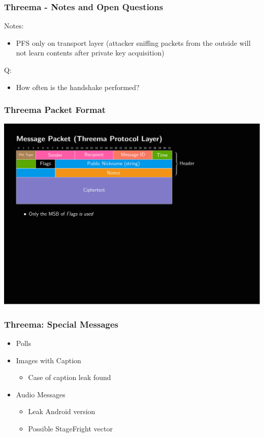 \documentclass[aspectratio=169]{beamer}
\begin{document}
\begin{frame}
	\frametitle{Threema - Notes and Open Questions}
	Notes:
	\begin{itemize}
		\item PFS only on transport layer (attacker sniffing packets from the outside will not learn contents after private key acquisition)
	\end{itemize}
	Q:
	\begin{itemize}
		\item How often is the handshake performed?
	\end{itemize}
\end{frame}

\begin{frame}
	\frametitle{Threema Packet Format}

	\includegraphics[page=1,clip,trim={.99cm 7.5cm 3.2cm 1cm},width=\textwidth]{out/messages.pdf}

\end{frame}

\begin{frame}
	\frametitle{Threema: Special Messages}
	\begin{itemize}
		\item Polls
		\item Images with Caption
			\begin{itemize}
				\item Case of caption leak found
			\end{itemize}
		\item Audio Messages
			\begin{itemize}
				\item Leak Android version
				\item Possible StageFright vector
			\end{itemize}
	\end{itemize}
\end{frame}
\end{document}
